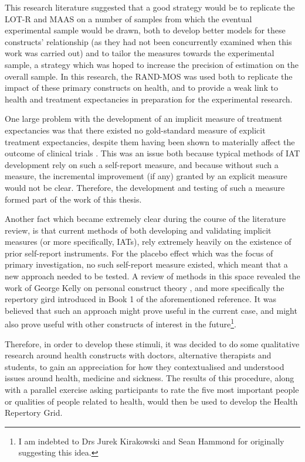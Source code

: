 This research literature suggested that a good strategy would be to replicate the LOT-R and MAAS on a number of samples from which the eventual experimental sample would be drawn, both to develop better models for these constructs' relationship (as they had not been concurrently examined when this work was carried out) and to tailor the measures towards the experimental sample, a strategy which was hoped to increase the precision of estimation on the overall sample. In this research, the RAND-MOS was used both to replicate the impact of these primary constructs on health, and to provide a weak link to health and treatment expectancies in preparation for the experimental research. 

One large problem with the development of an implicit measure of treatment expectancies was that there existed no gold-standard measure of explicit treatment expectancies, despite them having been shown to materially affect the outcome of clinical trials \cite{Linde2007,Bausell2005,Benedetti2005}. This was an issue both because typical methods of IAT development rely on such a self-report measure, and because without such a measure, the incremental improvement (if any) granted by an explicit measure would not be clear. Therefore, the development and testing of such a measure formed part of the work of this thesis. 

Another fact which became extremely clear during the course of the literature review, is that current methods of both developing and validating implicit measures (or more specifically, IATs), rely extremely heavily on the existence of prior self-report instruments. For the placebo effect which was the focus of primary investigation, no such self-report measure existed, which meant that a new approach needed to be tested. A review of methods in this space revealed the work of George Kelly on personal construct theory \cite{Kelly1991}, and more specifically the repertory gird introduced in Book 1 of the aforementioned reference. It was believed that such an approach might prove useful in the current case, and might also prove useful with other constructs of interest in the future\footnote{I am indebted to Drs Jurek Kirakowski and Sean Hammond for originally suggesting this idea.}.

Therefore, in order to develop these stimuli, it was decided to do some qualitative research around health constructs with doctors, alternative therapists and students, to gain an appreciation for how they contextualised and understood issues around health, medicine and sickness. The results of this procedure, along with a parallel exercise asking participants to rate the five most important people or qualities of people related to health, would then be used to develop the Health Repertory Grid. 

